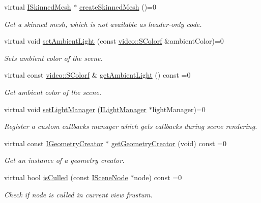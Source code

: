 \begin{DoxyCompactItemize}
virtual \hyperlink{classirr_1_1scene_1_1ISkinnedMesh}{I\+Skinned\+Mesh} $\ast$ \hyperlink{classirr_1_1scene_1_1ISceneManager_a67015b46ffde252ba723e6dcc6a93ac2}{create\+Skinned\+Mesh} ()=0
\begin{DoxyCompactList}\small\item\em Get a skinned mesh, which is not available as header-\/only code. \end{DoxyCompactList}\item 
\mbox{\label{classirr_1_1scene_1_1ISceneManager_a8a424accb615c4f60fde59f55033a816}} 
virtual void \hyperlink{classirr_1_1scene_1_1ISceneManager_a8a424accb615c4f60fde59f55033a816}{set\+Ambient\+Light} (const \hyperlink{classirr_1_1video_1_1SColorf}{video\+::\+S\+Colorf} \&ambient\+Color)=0
\begin{DoxyCompactList}\small\item\em Sets ambient color of the scene. \end{DoxyCompactList}\item 
\mbox{\label{classirr_1_1scene_1_1ISceneManager_a9da2090baaeeaa6261d6a1fac5025b09}} 
virtual const \hyperlink{classirr_1_1video_1_1SColorf}{video\+::\+S\+Colorf} \& \hyperlink{classirr_1_1scene_1_1ISceneManager_a9da2090baaeeaa6261d6a1fac5025b09}{get\+Ambient\+Light} () const =0
\begin{DoxyCompactList}\small\item\em Get ambient color of the scene. \end{DoxyCompactList}\item 
virtual void \hyperlink{classirr_1_1scene_1_1ISceneManager_a0065307bf3ff12fdc5b7bb624987a1c2}{set\+Light\+Manager} (\hyperlink{classirr_1_1scene_1_1ILightManager}{I\+Light\+Manager} $\ast$light\+Manager)=0
\begin{DoxyCompactList}\small\item\em Register a custom callbacks manager which gets callbacks during scene rendering. \end{DoxyCompactList}\item 
virtual const \hyperlink{classirr_1_1scene_1_1IGeometryCreator}{I\+Geometry\+Creator} $\ast$ \hyperlink{classirr_1_1scene_1_1ISceneManager_a9840cfd39b44f238d06b7bc51e6ba1f6}{get\+Geometry\+Creator} (void) const =0
\begin{DoxyCompactList}\small\item\em Get an instance of a geometry creator. \end{DoxyCompactList}\item 
virtual bool \hyperlink{classirr_1_1scene_1_1ISceneManager_aff6c6d553e0faf12bbfd33e814ad4352}{is\+Culled} (const \hyperlink{classirr_1_1scene_1_1ISceneNode}{I\+Scene\+Node} $\ast$node) const =0
\begin{DoxyCompactList}\small\item\em Check if node is culled in current view frustum. \end{DoxyCompactList}\end{DoxyCompactItemize}
